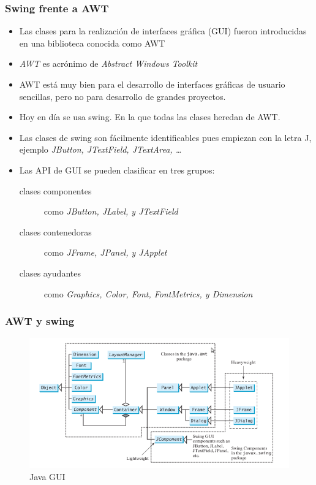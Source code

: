 \documentclass{beamer}
\begin{document}
\begin{frame}
\frametitle{Swing frente a AWT}
\begin{itemize}[<+->]
\item Las clases para la realización de interfaces gráfica (\alert{GUI}) fueron introducidas en una biblioteca conocida como \alert{AWT}
\item \emph{AWT} es acrónimo de \emph{Abstract Windows Toolkit}
\item AWT está muy bien para el desarrollo de interfaces gráficas de usuario sencillas, pero no para desarrollo de grandes proyectos.
\item Hoy en día se usa \alert{swing}. En la que todas las clases heredan de AWT.
\item Las clases de swing son fácilmente identificables pues empiezan con la letra \alert{J}, ejemplo \emph{JButton, JTextField, JTextArea, \dots}
\item Las API de GUI se pueden clasificar en tres grupos:
\begin{description}
\item[clases componentes] como \emph{JButton, JLabel, y JTextField}
\item[clases contenedoras] como \emph{JFrame, JPanel, y JApplet}
\item[clases ayudantes] como \emph{Graphics, Color, Font, FontMetrics, y Dimension}
\end{description}
\end{itemize}
\end{frame}

\begin{frame}
\frametitle{AWT y swing}
\begin{figure}
\includegraphics[width=\textwidth]{imagenes/awt_swing.png}
\caption{Java GUI}
\end{figure}
\end{frame}
\end{document}
